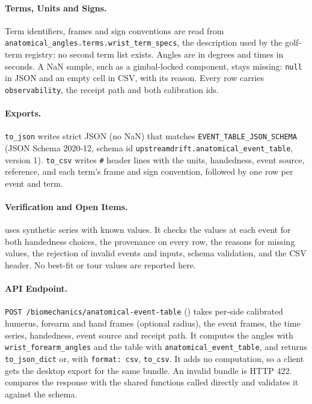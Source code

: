 \documentclass[11pt,a4paper]{article}
\begin{document}
\paragraph{Terms, Units and Signs.}
Term identifiers, frames and sign conventions are read from
\texttt{anatomical\_angles.terms.wrist\_term\_specs}, the description used by
the golf-term registry; no second term list exists.  Angles are in degrees
and times in seconds.  A NaN sample, such as a gimbal-locked component, stays
missing: \texttt{null} in JSON and an empty cell in CSV, with its reason.  Every
row carries \texttt{observability}, the receipt path and both calibration ids.

\paragraph{Exports.}
\texttt{to\_json} writes strict JSON (no NaN) that matches
\texttt{EVENT\_TABLE\_JSON\_SCHEMA} (JSON Schema 2020-12, schema id
\texttt{upstreamdrift.anatomical\_event\_table}, version 1).  \texttt{to\_csv}
writes \texttt{\#} header lines with the units, handedness, event source,
reference, and each term's frame and sign convention, followed by one row
per event and term.

\paragraph{Verification and Open Items.}
 uses synthetic series
with known values.  It checks the values at each event for both handedness
choices, the provenance on every row, the reasons for missing values, the
rejection of invalid events and inputs, schema validation, and the CSV
header.  No best-fit or tour values are reported here.

\paragraph{API Endpoint.}
\texttt{POST /biomechanics/anatomical-event-table}
() takes per-side calibrated humerus,
forearm and hand frames (optional radius), the event frames, the time
series, handedness, event source and receipt path.  It computes the angles
with \texttt{wrist\_forearm\_angles} and the table with
\texttt{anatomical\_event\_table}, and returns \texttt{to\_json\_dict} or,
with \texttt{format: csv}, \texttt{to\_csv}.  It adds no computation, so a
client gets the desktop export for the same bundle.  An invalid bundle is
HTTP 422.  
compares the response with the shared functions called directly and
validates it against the schema.
\end{document}
